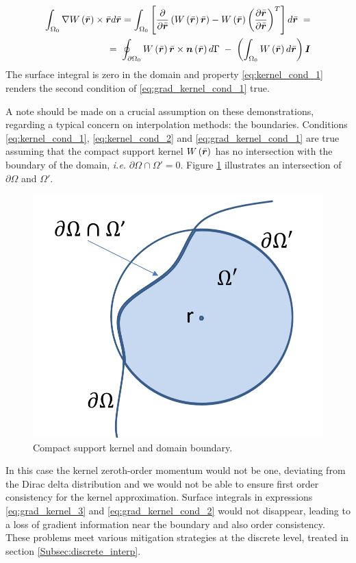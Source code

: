 % 
\begin{equation} \label{eq:grad_kernel_cond_2}
\begin{split}
\int_{\Omega_0} \nabla { W \left( \bar{\boldsymbol{r}} \right) \times \bar{\boldsymbol{r}} }d\bar{\boldsymbol{r}} = \int_{\Omega_0} \left[ \frac{\partial}{\partial \bar{\boldsymbol{r}}} \left( W \left( \bar{\boldsymbol{r}} \right)  \bar{\boldsymbol{r}} \right) - W \left( \bar{\boldsymbol{r}} \right) \left( \frac{\partial\bar{\boldsymbol{r}}}{\partial\bar{\boldsymbol{r}}} \right)^T  \right] d\bar{\boldsymbol{r}} \;=\\
=\; \oint_{\partial\Omega_0} W \left( \bar{\boldsymbol{r}} \right)\bar{\boldsymbol{r}} \times \boldsymbol{n}\left( \bar{\boldsymbol{r}} \right) d\Gamma\; -\; \left( \int_{\Omega_0} W \left( \bar{\boldsymbol{r}} \right) d\bar{\boldsymbol{r}}  \right)\boldsymbol{I}
\end{split}
\end{equation}
%
The surface integral is zero in the domain and property \eqref{eq:kernel_cond_1} renders the second condition of \eqref{eq:grad_kernel_cond_1} true.

A note should be made on a crucial assumption on these demonstrations, regarding a typical concern on interpolation methods: the boundaries. Conditions \eqref{eq:kernel_cond_1}, \eqref{eq:kernel_cond_2} and \eqref{eq:grad_kernel_cond_1} are true assuming that the compact support kernel $W \left( \bar{\boldsymbol{r}} \right) $ has no intersection with the boundary of the domain, \textit{i.e.} $\partial \Omega \cap \Omega' = 0$. Figure \ref{fig:cont_kernel} illustrates an intersection of $\partial \Omega $ and $\Omega'$.

%
\begin{figure}[ht!]
	\centering 
	\includegraphics[width=0.30\linewidth]{Figures/3.Chapter/cont_kernel}
	\caption{Compact support kernel and domain boundary.}
	\label{fig:cont_kernel} 
\end{figure}
%
In this case the kernel zeroth-order momentum would not be one, deviating from the Dirac delta distribution and we would not be able to ensure first order consistency for the kernel approximation. Surface integrals in expressions \eqref{eq:grad_kernel_3} and \eqref{eq:grad_kernel_cond_2} would not disappear, leading to a loss of gradient information near the boundary and also order consistency. These problems meet various mitigation strategies at the discrete level, treated in section \ref{Subsec:discrete_interp}.

